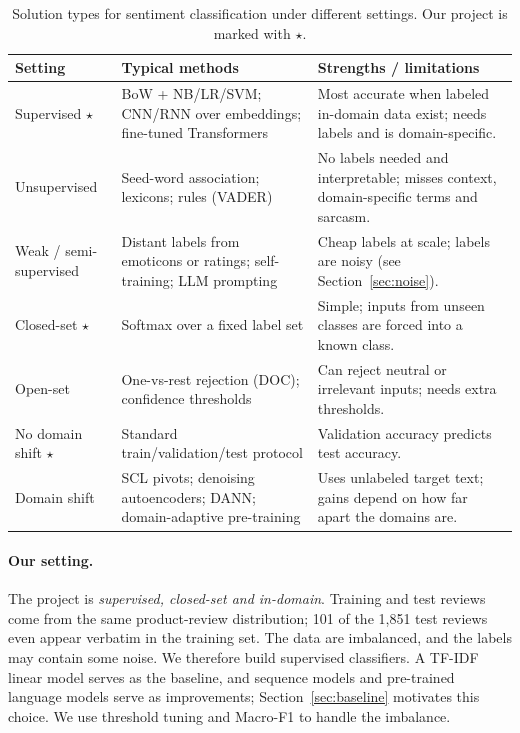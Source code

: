 \begin{table}[!htbp]
\centering
\caption{Solution types for sentiment classification under different settings. Our project is marked with $\star$.}
\label{tab:a1-settings}
\small
\begin{tabularx}{\textwidth}{l Y Y}
\toprule
Setting & Typical methods & Strengths / limitations \\
\midrule
Supervised $\star$ & BoW + NB/LR/SVM; CNN/RNN over embeddings; fine-tuned Transformers\cite{devlin2019bert} & Most accurate when labeled in-domain data exist; needs labels and is domain-specific. \\
Unsupervised & Seed-word association; lexicons; rules (VADER) & No labels needed and interpretable; misses context, domain-specific terms and sarcasm. \\
Weak / semi-supervised & Distant labels from emoticons or ratings; self-training; LLM prompting\cite{zhang2023sentiment} & Cheap labels at scale; labels are noisy (see Section~\ref{sec:noise}). \\
\midrule
Closed-set $\star$ & Softmax over a fixed label set & Simple; inputs from unseen classes are forced into a known class. \\
Open-set & One-vs-rest rejection (DOC); confidence thresholds & Can reject neutral or irrelevant inputs; needs extra thresholds. \\
\midrule
No domain shift $\star$ & Standard train/validation/test protocol & Validation accuracy predicts test accuracy. \\
Domain shift & SCL pivots\cite{blitzer2007biographies}; denoising autoencoders; DANN; domain-adaptive pre-training & Uses unlabeled target text; gains depend on how far apart the domains are. \\
\bottomrule
\end{tabularx}
\end{table}

\paragraph{Our setting.}
The project is \emph{supervised, closed-set and in-domain}.
Training and test reviews come from the same product-review distribution; 101 of the 1{,}851 test reviews even appear verbatim in the training set.
The data are imbalanced, and the labels may contain some noise.
We therefore build supervised classifiers. A TF-IDF linear model serves as the baseline, and sequence models and pre-trained language models serve as improvements; Section~\ref{sec:baseline} motivates this choice.
We use threshold tuning and Macro-F1 to handle the imbalance.
